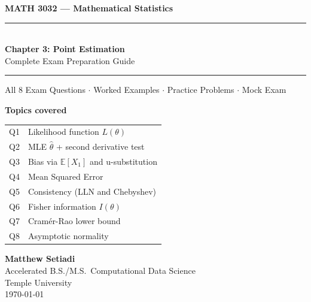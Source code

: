 \documentclass[11pt,a4paper]{article}
\begin{document}

\begin{titlepage}
  \begin{center}
    \vspace*{2cm}

    {\LARGE\bfseries MATH 3032 --- Mathematical Statistics}\\[10pt]
    \rule{\linewidth}{1pt}\\[8pt]
    {\huge\bfseries Chapter 3: Point Estimation}\\[6pt]
    {\Large Complete Exam Preparation Guide}\\[8pt]
    \rule{\linewidth}{1pt}

    \vspace{1.5cm}

    {\large All 8 Exam Questions $\cdot$ Worked Examples $\cdot$ Practice Problems $\cdot$ Mock Exam}

    \vspace{2cm}

    \begin{tcolorbox}[formulabox, width=0.72\textwidth, halign=center]
      \centering
      \textbf{Topics covered}\\[6pt]
      \begin{tabular}{ll}
        Q1 & Likelihood function $L(\theta)$ \\
        Q2 & MLE $\hat\theta$ + second derivative test \\
        Q3 & Bias via $\mathbb{E}[X_1]$ and u-substitution \\
        Q4 & Mean Squared Error \\
        Q5 & Consistency (LLN and Chebyshev) \\
        Q6 & Fisher information $I(\theta)$ \\
        Q7 & Cram\'{e}r-Rao lower bound \\
        Q8 & Asymptotic normality \\
      \end{tabular}
    \end{tcolorbox}

    \vspace{2cm}

    {\large\bfseries Matthew Setiadi}\\[4pt]
    {\normalsize Accelerated B.S./M.S.\ Computational Data Science}\\[2pt]
    {\normalsize Temple University}\\[2pt]
    {\normalsize\color{sectionGray} \today}


\end{center}
\end{titlepage}
\end{document}
